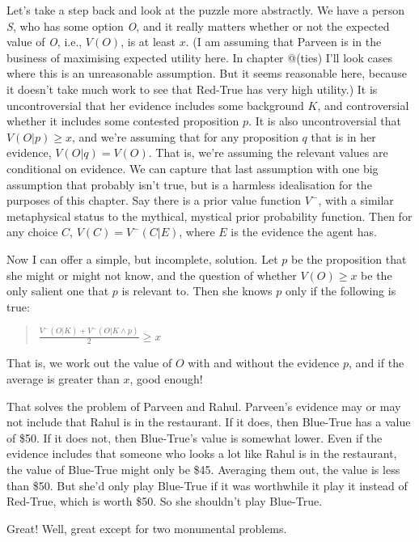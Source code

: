 \documentclass[11pt,]{book}
\begin{document}
Let's take a step back and look at the puzzle more abstractly. We have a person \emph{S}, who has some option \emph{O}, and it really matters whether or not the expected value of \emph{O}, i.e., \(V(O)\), is at least \(x\). (I am assuming that Parveen is in the business of maximising expected utility here. In chapter @(ties) I'll look cases where this is an unreasonable assumption. But it seems reasonable here, because it doesn't take much work to see that Red-True has very high utility.) It is uncontroversial that her evidence includes some background \(K\), and controversial whether it includes some contested proposition \(p\). It is also uncontroversial that \(V(O | p) \geq x\), and we're assuming that for any proposition \(q\) that is in her evidence, \(V(O | q) = V(O)\). That is, we're assuming the relevant values are conditional on evidence. We can capture that last assumption with one big assumption that probably isn't true, but is a harmless idealisation for the purposes of this chapter. Say there is a prior value function \(V^-\), with a similar metaphysical status to the mythical, mystical prior probability function. Then for any choice \(C\), \(V(C) = V^-(C | E)\), where \(E\) is the evidence the agent has.

Now I can offer a simple, but incomplete, solution. Let \(p\) be the proposition that she might or might not know, and the question of whether \(V(O) \geq x\) be the only salient one that \(p\) is relevant to. Then she knows \(p\) only if the following is true:

\begin{quote}
\(\frac{V^-(O | K) + V^-(O | K \wedge p)}{2} \geq x\)
\end{quote}

That is, we work out the value of \(O\) with and without the evidence \(p\), and if the average is greater than \(x\), good enough!

That solves the problem of Parveen and Rahul. Parveen's evidence may or may not include that Rahul is in the restaurant. If it does, then Blue-True has a value of \$50. If it does not, then Blue-True's value is somewhat lower. Even if the evidence includes that someone who looks a lot like Rahul is in the restaurant, the value of Blue-True might only be \$45. Averaging them out, the value is less than \$50. But she'd only play Blue-True if it was worthwhile it play it instead of Red-True, which is worth \$50. So she shouldn't play Blue-True.

Great! Well, great except for two monumental problems.
\end{document}
